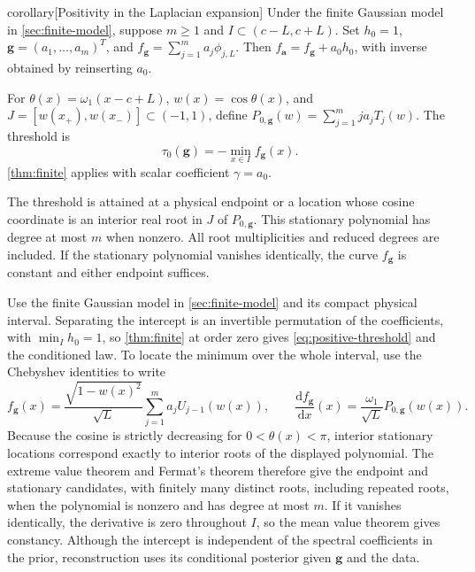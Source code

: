 \begin{theoremEnd}[combined main,category=positive]{corollary}[Positivity in the Laplacian expansion]
\label{cor:positive}
Under the finite Gaussian model in \cref{sec:finite-model}, suppose
$m\geq1$ and $I\subset(c-L,c+L)$. Set
$h_0=1$, $\boldsymbol g=(a_1,\ldots,a_m)^T$, and
$f_{\boldsymbol g}=\sum_{j=1}^ma_j\phi_{j,L}$.
Then $f_{\boldsymbol a}=f_{\boldsymbol g}+a_0h_0$, with inverse
obtained by reinserting $a_0$.

For $\theta(x)=\omega_1(x-c+L)$, $w(x)=\cos\theta(x)$, and
$J=[w(x_+),w(x_-)]\subset(-1,1)$, define
$P_{0,\boldsymbol g}(w)=\sum_{j=1}^mja_jT_j(w)$. The threshold is
\begin{equation}\label{eq:positive-threshold}
 \tau_0(\boldsymbol g)=-\min_{x\in I}f_{\boldsymbol g}(x).
\end{equation}
\cref{thm:finite} applies with scalar coefficient $\gamma=a_0$.

The threshold is attained at a physical endpoint or a location whose
cosine coordinate is an interior real root in $J$ of
$P_{0,\boldsymbol g}$. This stationary polynomial has degree at most
$m$ when nonzero. All root multiplicities and reduced degrees are
included. If the stationary polynomial vanishes identically, the
curve $f_{\boldsymbol g}$ is constant and either endpoint suffices.
\end{theoremEnd}

\begin{proofEnd}
Use the finite Gaussian model in \cref{sec:finite-model} and its compact
physical interval. Separating the intercept is an invertible permutation
of the coefficients, with $\min_Ih_0=1$, so \cref{thm:finite} at
order zero gives \cref{eq:positive-threshold} and the conditioned law.
To locate the minimum over the whole interval, use the Chebyshev
identities to write
\[
 f_{\boldsymbol g}(x)=\frac{\sqrt{1-w(x)^2}}{\sqrt L}
             \sum_{j=1}^ma_jU_{j-1}(w(x)),
 \qquad
 \frac{\mathrm{d}f_{\boldsymbol g}}{\mathrm{d}x}(x)=
             \frac{\omega_1}{\sqrt L}P_{0,\boldsymbol g}(w(x)).
\]
Because the cosine is strictly decreasing for $0<\theta(x)<\pi$,
interior stationary locations correspond exactly to interior roots of
the displayed polynomial. The extreme value theorem and Fermat's
theorem therefore give the endpoint and stationary candidates, with
finitely many distinct roots, including repeated roots, when the
polynomial is nonzero and has degree at most $m$. If it vanishes
identically, the derivative is zero throughout $I$, so the mean value
theorem gives constancy. Although the intercept is
independent of the spectral coefficients in the prior, reconstruction
uses its conditional posterior given $\boldsymbol g$ and the data.
\end{proofEnd}

